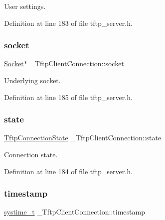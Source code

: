 User settings. 



Definition at line 183 of file tftp\+\_\+server.\+h.

\mbox{\label{struct__TftpClientConnection_a8f3e2f235189955f471f108e9ee39da4}} 
\subsubsection{\texorpdfstring{socket}{socket}}
{\footnotesize\ttfamily \hyperlink{socket_8h_aa85acfb0fa336ef495e6ba87fb88fc48}{Socket}$\ast$ \+\_\+\+Tftp\+Client\+Connection\+::socket}



Underlying socket. 



Definition at line 185 of file tftp\+\_\+server.\+h.

\mbox{\label{struct__TftpClientConnection_a18833ef8d7ab8b7443b50707b93144a0}} 
\subsubsection{\texorpdfstring{state}{state}}
{\footnotesize\ttfamily \hyperlink{tftp__server_8h_ab2a2374014f9d5d77c65b15bb32f3a4a}{Tftp\+Connection\+State} \+\_\+\+Tftp\+Client\+Connection\+::state}



Connection state. 



Definition at line 184 of file tftp\+\_\+server.\+h.

\mbox{\label{struct__TftpClientConnection_ab4a0c626593f974ddd769feeeb4c62c9}} 
\subsubsection{\texorpdfstring{timestamp}{timestamp}}
{\footnotesize\ttfamily \hyperlink{compiler__port_8h_ae3e32a98d431a02106616da3071832dd}{systime\+\_\+t} \+\_\+\+Tftp\+Client\+Connection\+::timestamp}



